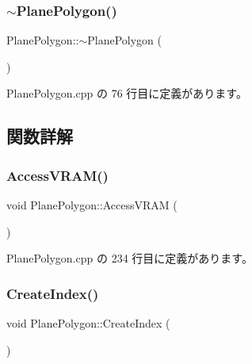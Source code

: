\subsubsection{\texorpdfstring{$\sim$\+Plane\+Polygon()}{~PlanePolygon()}}
{\footnotesize\ttfamily Plane\+Polygon\+::$\sim$\+Plane\+Polygon (\begin{DoxyParamCaption}{ }\end{DoxyParamCaption})\hspace{0.3cm}{\ttfamily [virtual]}}



 Plane\+Polygon.\+cpp の 76 行目に定義があります。



\subsection{関数詳解}
\mbox{\label{class_plane_polygon_a88e476aa4b627d7242dc4f1b5eccf889}} 
\subsubsection{\texorpdfstring{Access\+V\+R\+A\+M()}{AccessVRAM()}}
{\footnotesize\ttfamily void Plane\+Polygon\+::\+Access\+V\+R\+AM (\begin{DoxyParamCaption}{ }\end{DoxyParamCaption})\hspace{0.3cm}{\ttfamily [private]}}



 Plane\+Polygon.\+cpp の 234 行目に定義があります。

\mbox{\label{class_plane_polygon_a55840ace8bfa216c37f94e963b3fa5e3}} 
\subsubsection{\texorpdfstring{Create\+Index()}{CreateIndex()}}
{\footnotesize\ttfamily void Plane\+Polygon\+::\+Create\+Index (\begin{DoxyParamCaption}{ }\end{DoxyParamCaption})\hspace{0.3cm}{\ttfamily [private]}}



